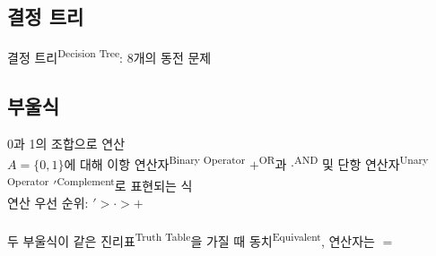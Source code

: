 \subsection{결정 트리}
결정 트리\textsuperscript{Decision Tree}: 8개의 동전 문제
\newpage
\subsection{부울식}
0과 1의 조합으로 연산\\
$A = \{0, 1\}$에 대해 이항 연산자\textsuperscript{Binary Operator} $+$\textsuperscript{OR}과 $\cdot$\textsuperscript{AND} 및
단항 연산자\textsuperscript{Unary Operator} $'$\textsuperscript{Complement}로 표현되는 식\\
연산 우선 순위: $' > \cdot > +$\\\\
두 부울식이 같은 진리표\textsuperscript{Truth Table}을 가질 때 동치\textsuperscript{Equivalent}, 연산자는 $=$

